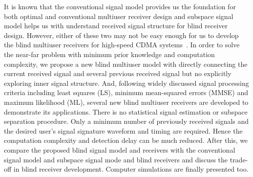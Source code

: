 \documentclass[a4paper,10pt,fleqn, twocolumn]{IEEETran}
\begin{document}
It is known that the conventional signal model provides us the
foundation for both optimal and conventional multiuser receiver
design and subspace signal model helps us with understand received
signal structure for blind receiver design. However, either of
these two may not be easy enough for us to develop the blind
multiuser receivers for high-speed CDMA systems~\cite{Andr05}. In
order to solve the near-far problem with minimum prior knowledge
and computation complexity, we propose a new blind multiuser model
with directly connecting the current received signal and several
previous received signal but no explicitly exploring inner signal
structure. And, following widely discussed signal processing
criteria including least squares (LS), minimum mean-squared errors
(MMSE) and maximum likelihood (ML), several new blind multiuser
receivers are developed to demonstrate its applications. There is
no statistical signal estimation or subspace separation procedure.
Only a minimum number of previously received signals and the
desired user's signal signature waveform and timing are required.
Hence the computation complexity and detection delay can be much
reduced. After this, we compare the proposed blind signal model
and receivers with the conventional signal model and subspace
signal mode and blind receivers and discuss the trade-off in blind
receiver development. Computer simulations are finally presented
too.
\end{document}

